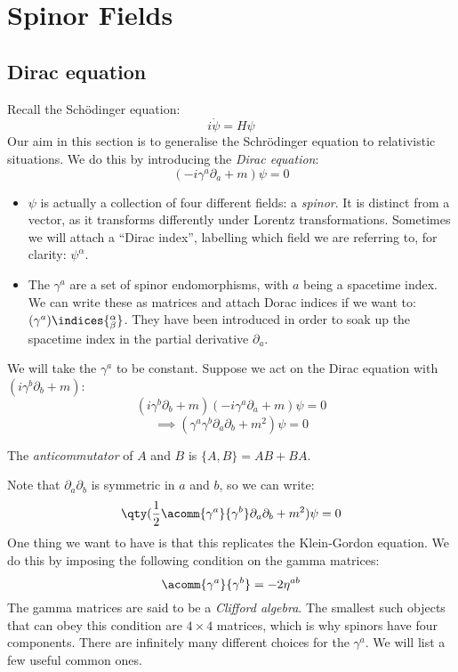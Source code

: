 \documentclass{jknotes} %
\begin{document}
\section{Spinor Fields}

\subsection{Dirac equation}

Recall the Sch\"odinger equation:
\begin{equation}
    i\dot\psi = H\psi
\end{equation}
Our aim in this section is to generalise the Schr\"odinger equation to relativistic situations. We do this by introducing the \emph{Dirac equation}:
\begin{equation}
    (-i\gamma^a\partial_a + m)\psi=0
\end{equation}
\begin{itemize}
    \item \(\psi\) is actually a collection of four different fields: a \emph{spinor}. It is distinct from a vector, as it transforms differently under Lorentz transformations. Sometimes we will attach a ``Dirac index'', labelling which field we are referring to, for clarity: \(\psi^\alpha\).
    \item The \(\gamma^a\) are a set of spinor endomorphisms, with \(a\) being a spacetime index. We can write these as matrices and attach Dorac indices if we want to: \((\gamma^a)\indices{^\alpha_\beta}\). They have been introduced in order to soak up the spacetime index in the partial derivative \(\partial_a\).
\end{itemize}
We will take the \(\gamma^a\) to be constant. Suppose we act on the Dirac equation with \((i\gamma^b\partial_b+m)\):
\begin{equation}
    (i\gamma^b\partial_b+m)(-i\gamma^a\partial_a+m)\psi=0
\end{equation}
\begin{equation}
    \implies (\gamma^a\gamma^b\partial_a\partial_b+m^2)\psi = 0
\end{equation}
\begin{defn}
    The \emph{anticommutator} of \(A\) and \(B\) is \(\{A,B\}=AB+BA\).
\end{defn}
Note that \(\partial_a\partial_b\) is symmetric in \(a\) and \(b\), so we can write:
\begin{equation}
    \qty(\frac{1}{2}\acomm{\gamma^a}{\gamma^b}\partial_a\partial_b + m^2) \psi = 0
\end{equation}
One thing we want to have is that this replicates the Klein-Gordon equation. We do this by imposing the following condition on the gamma matrices:
\begin{equation}
    \acomm{\gamma^a}{\gamma^b} = -2\eta^{ab}
\end{equation}
The gamma matrices are said to be a \emph{Clifford algebra}. The smallest such objects that can obey this condition are \(4\times4\) matrices, which is why spinors have four components. There are infinitely many different choices for the \(\gamma^a\). We will list a few useful common ones.
\end{document}
